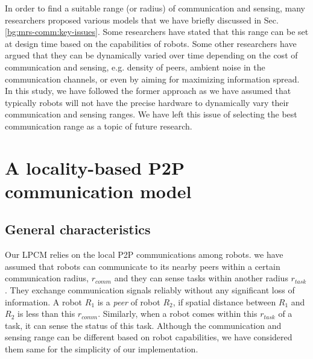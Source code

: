 In order to find a suitable  range (or radius) of communication and sensing,  many researchers proposed various models that we have briefly discussed in Sec. \ref{bg:mrs-comm:key-issues}. Some researchers have stated that this range can be set at design time based on the capabilities of robots. Some other researchers have argued that they can be dynamically varied over time depending on the  cost of communication and sensing, e.g. density of peers, ambient noise in the communication channels, or even by aiming for maximizing information spread. In this study, we have followed the former approach as we have assumed that typically robots will not have the precise hardware to dynamically vary their communication and sensing ranges. We have left this issue of selecting the best communication range as a topic of future research.
\section{A locality-based P2P communication model}
\label{local-comm:model}
\subsection{General characteristics}
Our LPCM relies on the local P2P communications among robots. we have assumed that robots can communicate to its nearby peers within a certain communication radius, $r_{comm}$ and they can sense tasks within another radius $r_{task}$. They exchange communication signals reliably without any significant loss of information. A robot $R_1$ is a {\em peer} of robot $R_2$, if spatial distance between $R_1$ and $R_2$ is less than this $r_{comm}$.
Similarly, when a robot comes within this $r_{task}$ of a task, it can sense the status of this task. Although the communication and sensing  range can be different based on robot capabilities, we have considered them same for the simplicity of our implementation.

